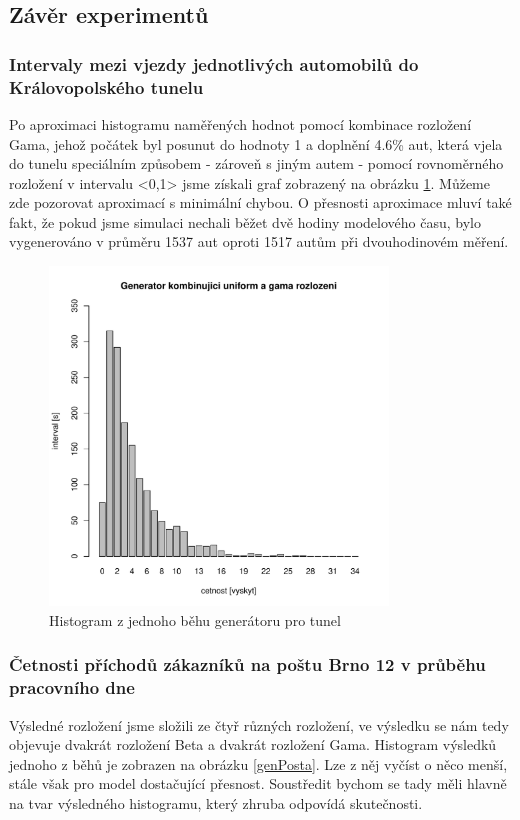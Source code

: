\documentclass[12pt,a4paper]{article}
\begin{document}
	\subsection{Závěr experimentů}
		\subsubsection{Intervaly mezi vjezdy jednotlivých automobilů do Královopolského tunelu}
		Po aproximaci histogramu naměřených hodnot pomocí kombinace rozložení Gama, jehož počátek byl posunut
		do hodnoty 1 a doplnění 4.6\% aut, která vjela do tunelu speciálním způsobem - zároveň s jiným autem - 
		pomocí rovnoměrného rozložení v intervalu <0,1> jsme získali graf zobrazený na obrázku \ref{genTunel}. Můžeme zde
		pozorovat aproximací s minimální chybou. O přesnosti aproximace mluví také fakt, že pokud jsme simulaci nechali běžet
		dvě hodiny modelového času, bylo vygenerováno v průměru 1537 aut oproti 1517 autům při dvouhodinovém měření.

		\begin{figure}[ht!]
		\centering
		\includegraphics[width=90mm]{../measuring/generatorTunelBarPlot.pdf}
		\caption{Histogram z jednoho běhu generátoru pro tunel}
		\label{genTunel}
		\end{figure}

		\subsubsection{Četnosti příchodů zákazníků na poštu Brno 12 v průběhu pracovního dne}
		Výsledné rozložení jsme složili ze čtyř různých rozložení, ve výsledku se nám tedy objevuje dvakrát rozložení Beta a dvakrát rozložení Gama. Histogram výsledků jednoho z běhů je zobrazen na obrázku \ref{genPosta}. Lze z něj vyčíst o něco menší, stále však pro model dostačující přesnost. Soustředit bychom se tady měli hlavně na tvar výsledného histogramu, který zhruba odpovídá skutečnosti.
\end{document}
